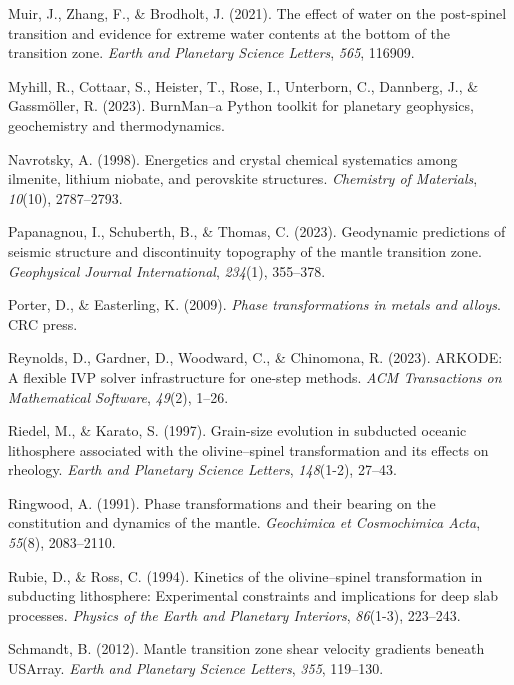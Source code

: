 \documentclass[draft,linenumbers]{agujournal2019}
\newlength{\cslhangindent}
\newenvironment{CSLReferences}[2]
 {\begin{list}{}{
  \setlength{\itemindent}{0pt}
  \setlength{\leftmargin}{0pt}
  \setlength{\parsep}{0pt}
  \ifodd #1
   \setlength{\leftmargin}{\cslhangindent}
   \setlength{\itemindent}{-\cslhangindent}
  \fi
  \setlength{\itemsep}{#2\baselineskip}
  }
  \item\relax}
 {\end{list}}
\begin{document}
\begin{CSLReferences}{1}{0}
Muir, J., Zhang, F., \& Brodholt, J. (2021). The effect of water on the
post-spinel transition and evidence for extreme water contents at the
bottom of the transition zone. \emph{Earth and Planetary Science
Letters}, \emph{565}, 116909.

Myhill, R., Cottaar, S., Heister, T., Rose, I., Unterborn, C., Dannberg,
J., \& Gassmöller, R. (2023). {BurnMan}--a {Python} toolkit for
planetary geophysics, geochemistry and thermodynamics.

Navrotsky, A. (1998). Energetics and crystal chemical systematics among
ilmenite, lithium niobate, and perovskite structures. \emph{Chemistry of
Materials}, \emph{10}(10), 2787--2793.

Papanagnou, I., Schuberth, B., \& Thomas, C. (2023). Geodynamic
predictions of seismic structure and discontinuity topography of the
mantle transition zone. \emph{Geophysical Journal International},
\emph{234}(1), 355--378.

Porter, D., \& Easterling, K. (2009). \emph{Phase transformations in
metals and alloys}. CRC press.

Reynolds, D., Gardner, D., Woodward, C., \& Chinomona, R. (2023).
{ARKODE}: A flexible {IVP} solver infrastructure for one-step methods.
\emph{ACM Transactions on Mathematical Software}, \emph{49}(2), 1--26.

Riedel, M., \& Karato, S. (1997). Grain-size evolution in subducted
oceanic lithosphere associated with the olivine--spinel transformation
and its effects on rheology. \emph{Earth and Planetary Science Letters},
\emph{148}(1-2), 27--43.

Ringwood, A. (1991). Phase transformations and their bearing on the
constitution and dynamics of the mantle. \emph{Geochimica et
Cosmochimica Acta}, \emph{55}(8), 2083--2110.

Rubie, D., \& Ross, C. (1994). Kinetics of the olivine--spinel
transformation in subducting lithosphere: Experimental constraints and
implications for deep slab processes. \emph{Physics of the Earth and
Planetary Interiors}, \emph{86}(1-3), 223--243.

Schmandt, B. (2012). Mantle transition zone shear velocity gradients
beneath {USArray}. \emph{Earth and Planetary Science Letters},
\emph{355}, 119--130.


\end{CSLReferences}
\end{document}

